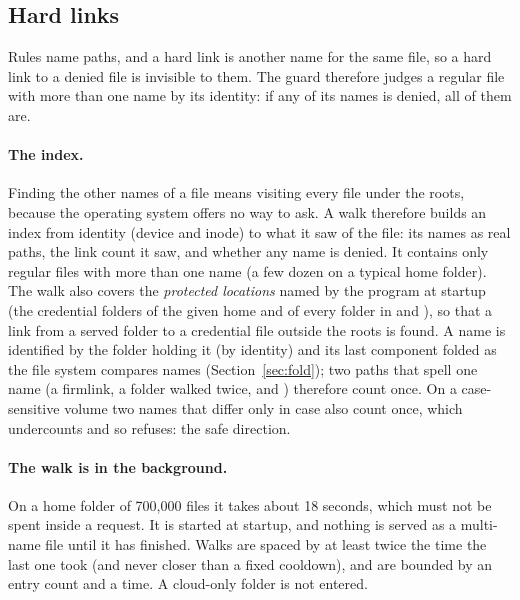 \subsection{Hard links}
\label{sec:linkindex}

Rules name paths, and a hard link is another name for the same file, so a hard link to a
denied file is invisible to them.  The guard therefore judges a regular file with more
than one name by its identity: if any of its names is denied, all of them are.

\paragraph{The index.}  Finding the other names of a file means visiting every file
under the roots, because the operating system offers no way to ask.  A walk therefore
builds an index from identity (device and inode) to what it saw of the file: its names
as real paths, the link count it saw, and whether any name is denied.  It contains only
regular files with more than one name (a few dozen on a typical home folder).  The walk
also covers the \emph{protected locations} named by the program at startup (the
credential folders of the given home and of every folder in  and
), so that a link from a served folder to a credential
file outside the roots is found.  A name is identified by the folder holding it (by
identity) and its last component folded as the file system compares names
(Section~\ref{sec:fold}); two paths that spell one name (a firmlink, a folder walked
twice,  and ) therefore count once.  On a case-sensitive volume
two names that differ only in case also count once, which undercounts and so refuses:
the safe direction.

\paragraph{The walk is in the background.}  On a home folder of 700{,}000 files it takes
about 18 seconds, which must not be spent inside a request.  It is started at startup,
and nothing is served as a multi-name file until it has finished.  Walks are spaced by at
least twice the time the last one took (and never closer than a fixed cooldown), and are
bounded by an entry count and a time.  A cloud-only folder is not entered.

